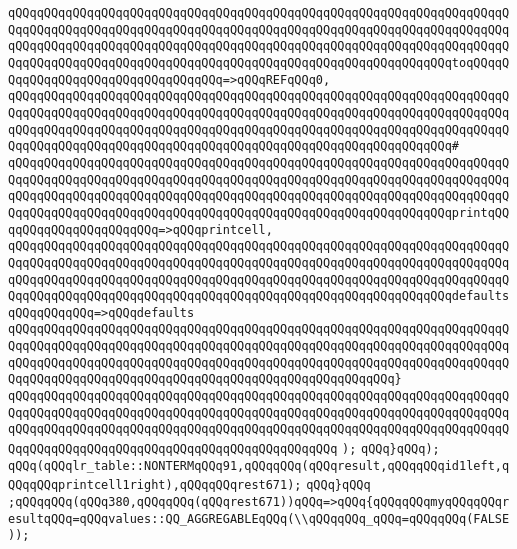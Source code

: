 \verb|qQQqqQQqqQQqqQQqqQQqqQQqqQQqqQQqqQQqqQQqqQQqqQQqqQQqqQQqqQQqqQQqqQQqqQQqqQQqqQQqqQQqqQQqqQQqqQQqqQQqqQQqqQQqqQQqqQQqqQQqqQQqqQQqqQQqqQQqqQQqqQQqqQQqqQQqqQQqqQQqqQQqqQQqqQQqqQQqqQQqqQQqqQQqqQQqqQQqqQQqqQQqqQQqqQQqqQQqqQQqqQQqqQQqqQQqqQQqqQQqqQQqqQQqqQQqqQQqqQQqqQQqqQQqqQQqtoqQQqqQQqqQQqqQQqqQQqqQQqqQQqqQQqqQQq=>qQQqREFqQQq0,|\newline
\verb|qQQqqQQqqQQqqQQqqQQqqQQqqQQqqQQqqQQqqQQqqQQqqQQqqQQqqQQqqQQqqQQqqQQqqQQqqQQqqQQqqQQqqQQqqQQqqQQqqQQqqQQqqQQqqQQqqQQqqQQqqQQqqQQqqQQqqQQqqQQqqQQqqQQqqQQqqQQqqQQqqQQqqQQqqQQqqQQqqQQqqQQqqQQqqQQqqQQqqQQqqQQqqQQqqQQqqQQqqQQqqQQqqQQqqQQqqQQqqQQqqQQqqQQqqQQqqQQqqQQqqQQqqQQqqQQq#|\newline
\verb|qQQqqQQqqQQqqQQqqQQqqQQqqQQqqQQqqQQqqQQqqQQqqQQqqQQqqQQqqQQqqQQqqQQqqQQqqQQqqQQqqQQqqQQqqQQqqQQqqQQqqQQqqQQqqQQqqQQqqQQqqQQqqQQqqQQqqQQqqQQqqQQqqQQqqQQqqQQqqQQqqQQqqQQqqQQqqQQqqQQqqQQqqQQqqQQqqQQqqQQqqQQqqQQqqQQqqQQqqQQqqQQqqQQqqQQqqQQqqQQqqQQqqQQqqQQqqQQqqQQqqQQqqQQqqQQqprintqQQqqQQqqQQqqQQqqQQqqQQq=>qQQqprintcell,|\newline
\verb|qQQqqQQqqQQqqQQqqQQqqQQqqQQqqQQqqQQqqQQqqQQqqQQqqQQqqQQqqQQqqQQqqQQqqQQqqQQqqQQqqQQqqQQqqQQqqQQqqQQqqQQqqQQqqQQqqQQqqQQqqQQqqQQqqQQqqQQqqQQqqQQqqQQqqQQqqQQqqQQqqQQqqQQqqQQqqQQqqQQqqQQqqQQqqQQqqQQqqQQqqQQqqQQqqQQqqQQqqQQqqQQqqQQqqQQqqQQqqQQqqQQqqQQqqQQqqQQqqQQqqQQqqQQqqQQqdefaultsqQQqqQQqqQQq=>qQQqdefaults|\newline
\verb|qQQqqQQqqQQqqQQqqQQqqQQqqQQqqQQqqQQqqQQqqQQqqQQqqQQqqQQqqQQqqQQqqQQqqQQqqQQqqQQqqQQqqQQqqQQqqQQqqQQqqQQqqQQqqQQqqQQqqQQqqQQqqQQqqQQqqQQqqQQqqQQqqQQqqQQqqQQqqQQqqQQqqQQqqQQqqQQqqQQqqQQqqQQqqQQqqQQqqQQqqQQqqQQqqQQqqQQqqQQqqQQqqQQqqQQqqQQqqQQqqQQqqQQqqQQqqQQqqQQqqQQq}|\newline
\verb|qQQqqQQqqQQqqQQqqQQqqQQqqQQqqQQqqQQqqQQqqQQqqQQqqQQqqQQqqQQqqQQqqQQqqQQqqQQqqQQqqQQqqQQqqQQqqQQqqQQqqQQqqQQqqQQqqQQqqQQqqQQqqQQqqQQqqQQqqQQqqQQqqQQqqQQqqQQqqQQqqQQqqQQqqQQqqQQqqQQqqQQqqQQqqQQqqQQqqQQqqQQqqQQqqQQqqQQqqQQqqQQqqQQqqQQqqQQqqQQqqQQqqQQqqQQqqQQq|\newline
\verb|);|\newline
\verb|qQQq}qQQq);|\newline
\verb|qQQq(qQQqlr_table::NONTERMqQQq91,qQQqqQQq(qQQqresult,qQQqqQQqid1left,qQQqqQQqprintcell1right),qQQqqQQqrest671);|\newline
\verb|qQQq}qQQq|\newline
\verb|;qQQqqQQq(qQQq380,qQQqqQQq(qQQqrest671))qQQq=>qQQq{qQQqqQQqmyqQQqqQQqresultqQQq=qQQqvalues::QQ_AGGREGABLEqQQq(\\qQQqqQQq_qQQq=qQQqqQQq(FALSE));|\newline
